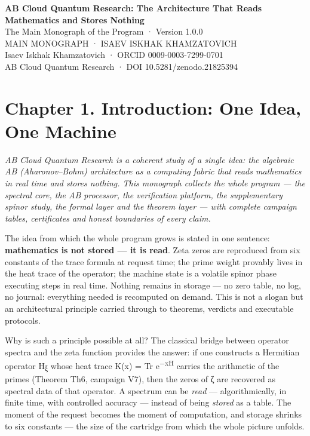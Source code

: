 \documentclass[11pt,a4paper]{article}
\begin{document}
\begin{center}
{\LARGE\bfseries AB Cloud Quantum Research: The Architecture That Reads Mathematics and Stores Nothing}\\[8pt]
{\large The Main Monograph of the Program · Version 1.0.0}\\[6pt]
{\color{copper}\small MAIN MONOGRAPH · ISAEV ISKHAK KHAMZATOVICH}\\[4pt]
{\small Isaev Iskhak Khamzatovich · ORCID 0009-0003-7299-0701}\\[2pt]
{\small AB Cloud Quantum Research · DOI 10.5281/zenodo.21825394}
\end{center}

\tableofcontents
\newpage

\section{Chapter 1. Introduction: One Idea, One Machine}

\noindent\textit{\color{copper}AB Cloud Quantum Research is a coherent study of a single idea: the algebraic AB (Aharonov–Bohm) architecture as a computing fabric that reads mathematics in real time and stores nothing. This monograph collects the whole program — the spectral core, the AB processor, the verification platform, the supplementary spinor study, the formal layer and the theorem layer — with complete campaign tables, certificates and honest boundaries of every claim.}

The idea from which the whole program grows is stated in one sentence: \textbf{mathematics is not stored — it is read}. Zeta zeros are reproduced from six constants of the trace formula at request time; the prime weight provably lives in the heat trace of the operator; the machine state is a volatile spinor phase executing steps in real time. Nothing remains in storage — no zero table, no log, no journal: everything needed is recomputed on demand. This is not a slogan but an architectural principle carried through to theorems, verdicts and executable protocols.

Why is such a principle possible at all? The classical bridge between operator spectra and the zeta function provides the answer: if one constructs a Hermitian operator H\textsubscript{ξ} whose heat trace K(x) = Tr e\textsuperscript{−xH} carries the arithmetic of the primes (Theorem Th6, campaign V7), then the zeros of ζ are recovered as spectral data of that operator. A spectrum can be \emph{read} — algorithmically, in finite time, with controlled accuracy — instead of being \emph{stored} as a table. The moment of the request becomes the moment of computation, and storage shrinks to six constants — the size of the cartridge from which the whole picture unfolds.
\end{document}
